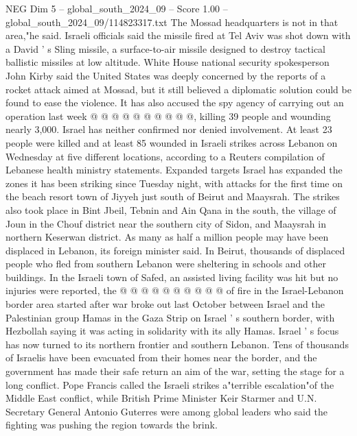 \begin{textsample}{NEG Dim 5 – global\_south\_2024\_09 – Score 1.00 – global\_south\_2024\_09/114823317.txt}
The Mossad headquarters is not in that area,"he said.
Israeli officials said the missile fired at Tel Aviv was shot down with a David ' s Sling missile, a surface-to-air missile designed to destroy tactical ballistic missiles at low altitude.
White House national security spokesperson John Kirby said the United States was deeply concerned by the reports of a rocket attack aimed at Mossad, but it still believed a diplomatic solution could be found to ease the violence.
It has also accused the spy agency of carrying out an operation last week @ @ @ @ @ @ @ @ @ @, killing 39 people and wounding nearly 3,000.
Israel has neither confirmed nor denied involvement.
At least 23 people were killed and at least 85 wounded in Israeli strikes across Lebanon on Wednesday at five different locations, according to a Reuters compilation of Lebanese health ministry statements.
Expanded targets Israel has expanded the zones it has been striking since Tuesday night, with attacks for the first time on the beach resort town of Jiyyeh just south of Beirut and Maaysrah.
The strikes also took place in Bint Jbeil, Tebnin and Ain Qana in the south, the village of Joun in the Chouf district near the southern city of Sidon, and Maaysrah in northern Keserwan district.
As many as half a million people may have been displaced in Lebanon, its foreign minister said.
In Beirut, thousands of displaced people who fled from southern Lebanon were sheltering in schools and other buildings.
In the Israeli town of Safed, an assisted living facility was hit but no injuries were reported, the @ @ @ @ @ @ @ @ @ @ of fire in the Israel-Lebanon border area started after war broke out last October between Israel and the Palestinian group Hamas in the Gaza Strip on Israel ' s southern border, with Hezbollah saying it was acting in solidarity with its ally Hamas.
Israel ' s focus has now turned to its northern frontier and southern Lebanon.
Tens of thousands of Israelis have been evacuated from their homes near the border, and the government has made their safe return an aim of the war, setting the stage for a long conflict.
Pope Francis called the Israeli strikes a"terrible escalation"of the Middle East conflict, while British Prime Minister Keir Starmer and U.N.
Secretary General Antonio Guterres were among global leaders who said the fighting was pushing the region towards the brink.

\end{textsample}
